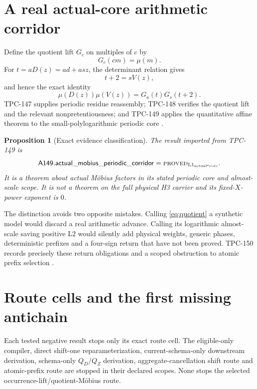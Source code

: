 \documentclass[11pt]{article}
\newtheorem{proposition}[theorem]{Proposition}
\theoremstyle{definition}
\theoremstyle{remark}
\newcommand{\Lone}{\mathrm{L1}}
\newcommand{\Ltwo}{\mathrm{L2}}
\newcommand{\PROVED}{\textnormal{\textsc{proved}}}
\begin{document}
\section{A real actual-core arithmetic corridor}

Define the quotient lift \(G_c\) on multiples of \(c\) by
\[
 G_c(cm)=\mu(m).
\]
For \(t=aD(z)=ad+as z\), the determinant relation gives
\[
 t+2=sV(z),
\]
and hence the exact identity
\begin{equation}
 \mu(D(z))\mu(V(z))=G_a(t)G_s(t+2).
\label{eq:quotient}
\end{equation}
TPC-147 supplies periodic residue reassembly; TPC-148 verifies the
quotient lift and the relevant nonpretentiousness; and TPC-149 applies
the quantitative affine theorem to the small-polylogarithmic periodic
core \citep{WangTPC147,WangTPC148,WangTPC149,TaoTeravainen2026}.

\begin{proposition}[Exact evidence classification]
\label{prop:classification}
The result imported from TPC-149 is
\[
 \mathsf{A149.actual\_mobius\_periodic\_corridor}
 =\PROVED_{\Lone_{\rm actual\mbox{-}core}}.
\]
It is a theorem about actual M\"obius factors in its stated periodic
core and almost-scale scope.  It is not a theorem on the full
physical H3 carrier and its fixed-\(X\)-power exponent is \(0\).
\end{proposition}

The distinction avoids two opposite mistakes.  Calling
\eqref{eq:quotient} a synthetic model would discard a real arithmetic
advance.  Calling its logarithmic almost-scale saving positive
\(\Ltwo\) would silently add physical weights, generic phases,
deterministic prefixes and a four-sign return that have not been
proved.  TPC-150 records precisely these return obligations and a
scoped obstruction to atomic prefix selection \citep{WangTPC150}.

\section{Route cells and the first missing antichain}

Each tested negative result stops only its exact route cell.  The
eligible-only compiler, direct shift-one reparameterization,
current-schema-only downstream derivation, schema-only \(Q_D/Q_Z\)
derivation, aggregate-cancellation shift route and atomic-prefix route
are stopped in their declared scopes.  None stops the selected
occurrence-lift/quotient-M\"obius route.
\end{document}
